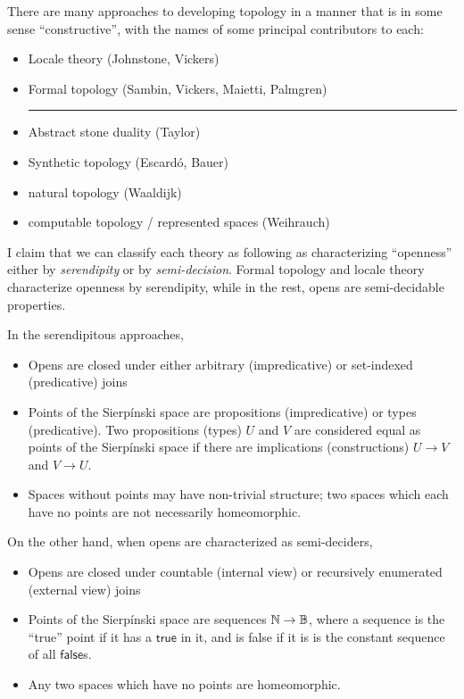 
There are many approaches to developing topology in a manner that is in some sense ``constructive'', with the names of some principal contributors to each:

\begin{itemize}
\item Locale theory (Johnstone, Vickers)
\item Formal topology (Sambin, Vickers, Maietti, Palmgren)
\hrule
\item Abstract stone duality (Taylor)
\item Synthetic topology (Escard\'o, Bauer) 
\item natural topology (Waaldijk)
\item computable topology / represented spaces (Weihrauch) 
\end{itemize}

I claim that we can classify each theory as following as characterizing ``openness'' either by \emph{serendipity} or by \emph{semi-decision}. Formal topology and locale theory characterize openness by serendipity, while in the rest, opens are semi-decidable properties.

In the serendipitous approaches,
\begin{itemize}
\item Opens are closed under either arbitrary (impredicative) or set-indexed (predicative) joins
\item Points of the Sierp\'inski space are propositions (impredicative) or types (predicative). Two propositions (types) $U$ and $V$ are considered equal as points of the Sierp\'inski space if there are implications (constructions) $U \to V$ and $V \to U$.
\item Spaces without points may have non-trivial structure; two spaces which each have no points are not necessarily homeomorphic.
\end{itemize}

On the other hand, when opens are characterized as semi-deciders,
\begin{itemize}
\item Opens are closed under countable (internal view) or recursively enumerated (external view) joins
\item Points of the Sierp\'inski space are sequences $\mathbb{N} \to \mathbb{B}$, where a sequence is the ``true'' point if it has a $\mathsf{true}$ in it, and is false if it is is the constant sequence of all $\mathsf{false}$s.
\item Any two spaces which have no points are homeomorphic.
\end{itemize}


